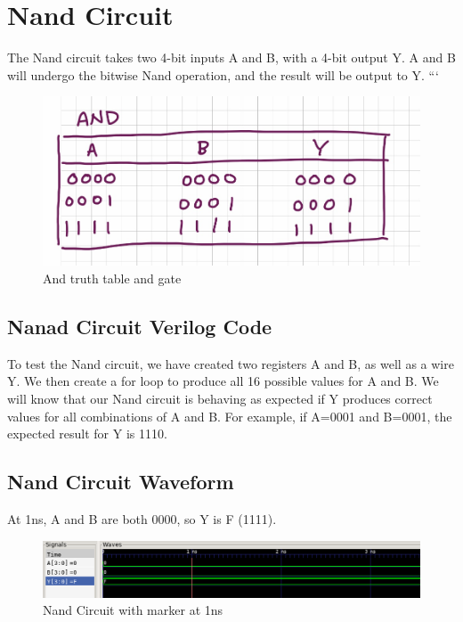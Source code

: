 \documentclass[12pt]{article}
\begin{document}
\section{Nand Circuit}

The Nand circuit takes two 4-bit inputs A and B, with a 4-bit output Y. A and B will undergo the bitwise Nand operation, and the result will be output to Y.
```\begin{figure}[H]
    \centering
    \includegraphics[width = 1.0\textwidth]{And/and-truth.jpeg}
    \caption{And truth table and gate}
    \label{fig:shift-table}
\end{figure}
\subsection{Nanad Circuit Verilog Code} 
 

To test the Nand circuit, we have created two registers A and B, as well as a wire Y. We then create a for loop to produce all 16 possible values for A and B. We will know that our Nand circuit is behaving as expected if Y produces correct values for all combinations of A and B. For example, if A=0001 and B=0001, the expected result for Y is 1110. 
 

\subsection{Nand Circuit Waveform} 

At 1ns, A and B are both 0000, so Y is F (1111).
\begin{figure}[H]
 \centering
 \includegraphics[width = 1.0\textwidth]{Nand/nand_wave.png}
 \caption{Nand Circuit with marker at 1ns}
 \label{fig:enter-label} 
\end{figure} 
\end{document}
